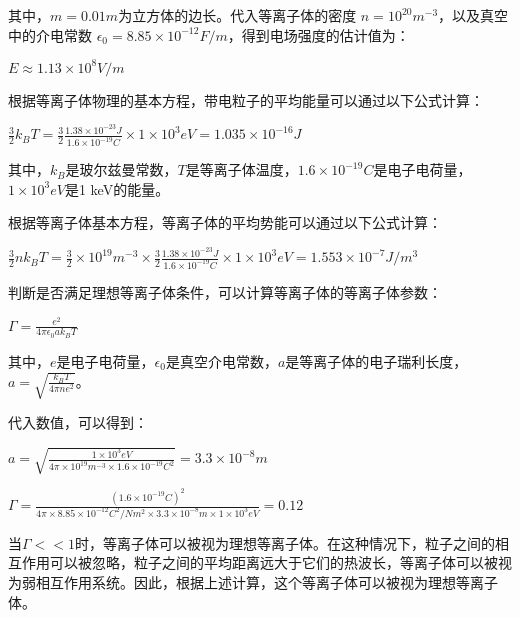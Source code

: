 \documentclass[12pt, a4paper, oneside]{ctexart}
\begin{document}
\begin{spacing}{2.0}
其中，$m = 0.01m$为立方体的边长。代入等离子体的密度 $n = 10^{20}m^{-3}$，以及真空中的介电常数 $\epsilon_0 = 8.85\times10^{-12}F/m$，得到电场强度的估计值为：

$E \approx 1.13\times10^8 V/m$



根据等离子体物理的基本方程，带电粒子的平均能量可以通过以下公式计算：

$\frac{3}{2}k_BT = \frac{3}{2}\frac{1.38\times10^{-23}J}{1.6\times10^{-19}C} \times 1\times10^3eV = 1.035\times10^{-16}J$

其中，$k_B$是玻尔兹曼常数，$T$是等离子体温度，$1.6\times10^{-19}C$是电子电荷量，$1\times10^3eV$是1 keV的能量。

根据等离子体基本方程，等离子体的平均势能可以通过以下公式计算：

$\frac{3}{2}n k_BT = \frac{3}{2} \times 10^{19}m^{-3} \times \frac{3}{2}\frac{1.38\times10^{-23}J}{1.6\times10^{-19}C} \times 1\times10^3eV = 1.553\times10^{-7}J/m^3$

判断是否满足理想等离子体条件，可以计算等离子体的等离子体参数：

$\Gamma = \frac{e^2}{4\pi\epsilon_0ak_BT}$

其中，$e$是电子电荷量，$\epsilon_0$是真空介电常数，$a$是等离子体的电子瑞利长度，$a=\sqrt{\frac{k_BT}{4\pi n e^2}}$。

代入数值，可以得到：

$a = \sqrt{\frac{1\times10^3eV}{4\pi\times10^{19}m^{-3}\times1.6\times10^{-19}C^2}} = 3.3\times10^{-8}m$

$\Gamma = \frac{(1.6\times10^{-19}C)^2}{4\pi\times8.85\times10^{-12}C^2/Nm^2\times3.3\times10^{-8}m\times1\times10^3eV} = 0.12$

当$\Gamma<<1$时，等离子体可以被视为理想等离子体。在这种情况下，粒子之间的相互作用可以被忽略，粒子之间的平均距离远大于它们的热波长，等离子体可以被视为弱相互作用系统。因此，根据上述计算，这个等离子体可以被视为理想等离子体。




\end{spacing}{}



\end{document}
